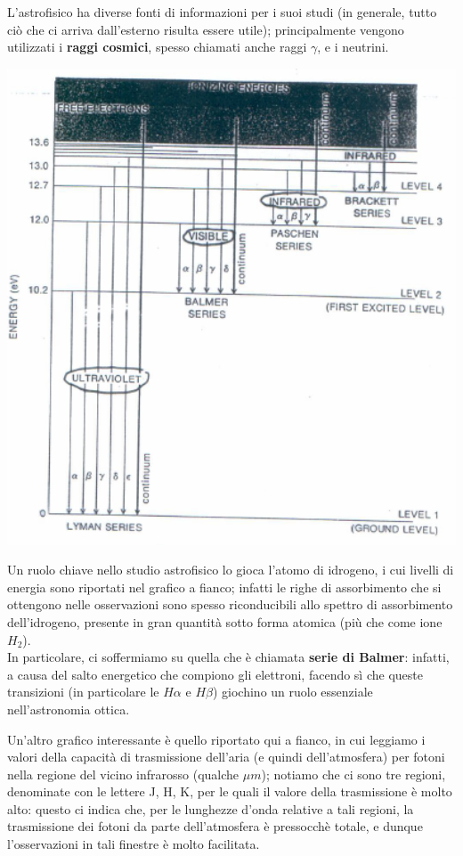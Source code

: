 L'astrofisico ha diverse fonti di informazioni per i suoi studi (in generale, tutto ciò che ci arriva dall'esterno risulta essere utile); principalmente vengono utilizzati i \textbf{raggi cosmici}, spesso chiamati anche raggi $\gamma$, e i neutrini.
\vspace{0.2cm}
\begin{minipage}{.50\textwidth}
	\centering
	\includegraphics[width=1\textwidth]{Img/bertin_3.png}
\end{minipage}
\begin{minipage}{.50\textwidth}
	Un ruolo chiave nello studio astrofisico lo gioca l'atomo di idrogeno, i cui livelli di energia sono riportati nel grafico a fianco; infatti le righe di assorbimento che si ottengono nelle osservazioni sono spesso riconducibili allo spettro di assorbimento dell'idrogeno, presente in gran quantità sotto forma atomica (più che come ione $H_2$).\\
	In particolare, ci soffermiamo su quella che è chiamata \textbf{serie di Balmer}: infatti, a causa del salto energetico che compiono gli elettroni, facendo sì che queste transizioni (in particolare le $H \alpha$ e $H \beta$) giochino un ruolo essenziale nell'astronomia ottica.
\end{minipage}
\begin{minipage}{.55\textwidth}
Un'altro grafico interessante è quello riportato qui a fianco, in cui leggiamo i valori della capacità di trasmissione dell'aria (e quindi dell'atmosfera) per fotoni nella regione del vicino infrarosso (qualche $\mu m$); notiamo che ci sono tre regioni, denominate con le lettere J, H, K, per le quali il valore della trasmissione è molto alto: questo ci indica che, per le lunghezze d'onda relative a tali regioni, la trasmissione dei fotoni da parte dell'atmosfera è pressocchè totale, e dunque l'osservazioni in tali finestre è molto facilitata.
\end{minipage}
